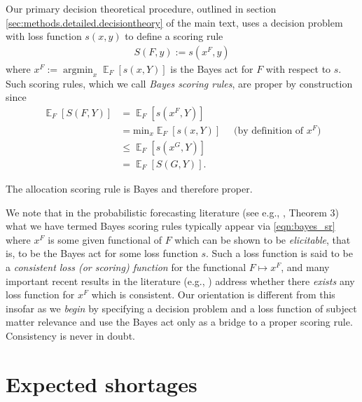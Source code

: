 \documentclass{article}
\DeclareMathOperator*{\argmin}{argmin}
\DeclareMathOperator{\Ex}{\mathbb{E}}
\begin{document}
Our primary decision theoretical procedure, outlined in section \ref{sec:methods.detailed.decisiontheory} of the main text, 
uses a decision problem with loss function $s(x,y)$ to define a scoring rule 
\begin{align}
S(F,y) := s(x^F,y) \label{eqn:bayes_sr}
\end{align}
where $x^F := \argmin_{x} \Ex_F[s(x,Y)]$ is the Bayes act for $F$ with respect to $s$. 
Such scoring rules, which we call \emph{Bayes scoring rules}, 
are proper by construction since
\begin{align}
\Ex_F [S(F, Y)] &= \Ex_F [ s(x^F, Y) ] \nonumber \\
 &= \mathrm{min}_{x} \Ex_F [ s(x, Y) ] \quad \text{ (by definition of $x^F$)} \\
 &\leq \Ex_F [ s(x^G, Y) ] \label{eqn:dt_proper_key} \\
 &= \Ex_F [ S(G, Y)]. \nonumber
\end{align}

The allocation scoring rule is Bayes and therefore proper.

We note that in the probabilistic forecasting literature (see e.g., \cite{gneiting2011making}, Theorem 3) what we have 
termed Bayes scoring rules typically appear via \eqref{eqn:bayes_sr} where $x^F$ is some given functional of $F$ which 
can be shown to be \emph{elicitable}, that is, to be the Bayes act for some loss function $s$.
Such a loss function is said to be a \emph{consistent loss (or scoring) function} for the functional $F \mapsto x^F$, and many important
recent results in the literature (e.g., \cite{fisslerziegel2016consistency}) address whether there \emph{exists} any loss 
function for $x^F$ which is consistent. Our orientation
is different from this insofar as we \emph{begin} by specifying a decision problem and a loss function of subject matter relevance
and use the Bayes act only as a bridge to a proper scoring rule.  Consistency is never in doubt.


\section{Expected shortages}
\label{sec:ex-shortage}
\end{document}
